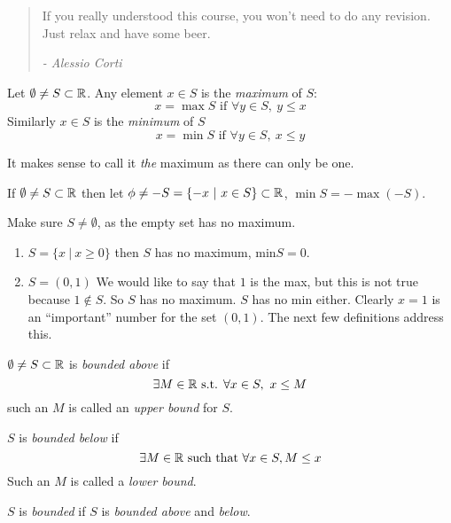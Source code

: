 \documentclass[twoside]{scrartcl}
\begin{document}
\begin{quote}
If you really understood this course, you won't need to do any revision. Just relax and have some beer. 
\begin{flushright}
      \textit{ -  Alessio Corti}
       \end{flushright} 
\end{quote} \vspace*{5pt}

\vspace*{5pt}
\begin{definition}
Let $\emptyset \neq S \subset \mathbb{R}$. Any element $x \in S$ is the \emph{maximum} of $S$:
\[x = \max S\text{ if }\forall y \in S,~y \leq x\]
Similarly $x \in S$ is the \emph{minimum} of $S$	
\[x = \min S\text{ if }\forall y\in S,~x \leq y\]
\end{definition}\vspace*{5pt}

It makes sense to call it \emph{the} maximum as there can only be one.\vspace*{5pt}

\begin{remark}
If $\emptyset \neq S \subset \mathbb{R}$ then let $\phi \neq -S = \{-x ~|~ x \in S\}\subset \mathbb{R}$, $\min S = -\max(-S)$. 	
\end{remark}\vspace*{5pt}
\begin{warning}
Make sure $S \neq \emptyset$, as the empty set has no maximum. 	
\end{warning}\vspace*{10pt}


\begin{examples}
\begin{enumerate}
\item $S = \{x ~|~ x \geq 0\}$
then $S$ has no maximum, min$S = 0$.

\item $S = (0,1)$
We would like to say that $1$ is the max, but this is not true because $1 \not \in S$. So $S$ has no maximum. $S$ has no min either. Clearly $x = 1$ is an ``important'' number for the set $(0,1)$. The next few definitions address this. 	
\end{enumerate}
\end{examples}\vspace*{5pt}


\begin{definition}
$\emptyset \neq S \subset \mathbb{R}$ is \emph{bounded above} if 
\[\exists M \in\mathbb{R} \text{ s.t. } \forall x \in S,~x \leq M\]
such an $M$ is called an \emph{upper bound} for $S$. 

$S$ is \emph{bounded below} if
\[\exists M \in \mathbb{R} \text{ such that } \forall x \in S, M \leq x\]
Such an $M$ is called a \emph{lower bound}.

$S$ is \emph{bounded} if $S$ is \emph{bounded above} and \emph{below}. 
\end{definition}\vspace*{5pt}
\end{document}
